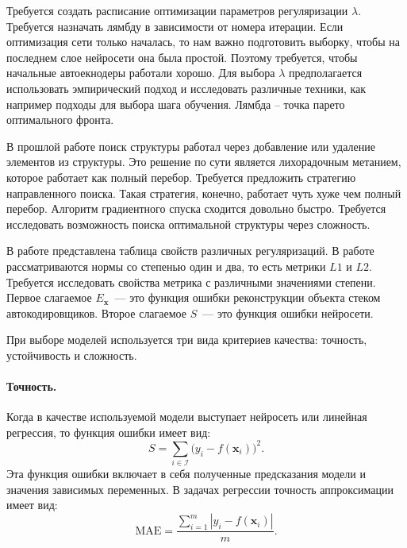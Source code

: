 \documentclass[12pt, twoside]{article}
\newcommand{\xb}{{\mathbf{x}}}
\newenvironment{comment}{}{}
\begin{document}
\begin{comment}
Требуется создать расписание оптимизации параметров регуляризации $\lambda$. Требуется назначать лямбду в зависимости от номера итерации. Если оптимизация сети только началась, то нам важно подготовить выборку, чтобы на последнем слое нейросети она была простой. Поэтому требуется, чтобы начальные автоекнодеры работали хорошо. Для выбора $\lambda$ предполагается использовать эмпирический подход и исследовать различные техники, как например подходы для выбора шага обучения. Лямбда – точка парето оптимального фронта.

В прошлой работе поиск структуры работал через добавление или удаление элементов из структуры. Это решение по сути является лихорадочным метанием, которое работает как полный перебор. Требуется предложить стратегию направленного поиска. Такая стратегия, конечно, работает чуть хуже чем полный перебор. 
Алгоритм градиентного спуска сходится довольно быстро. Требуется исследовать возможность поиска оптимальной структуры через сложность. 




В работе \cite{bib_1} представлена таблица свойств различных регуляризаций. В работе рассматриваются нормы со степенью один и два, то есть метрики $L1$ и $L2$. Требуется исследовать свойства метрика с различными значениями степени. 
Первое слагаемое $E_{\textbf{x}}$~--- это функция ошибки реконструкции объекта стеком автокодировщиков. Второе слагаемое $S$~--- это функция ошибки нейросети.

При выборе моделей используется три вида критериев качества: точность, устойчивость и сложность.

\paragraph{Точность.}

Когда в качестве используемой модели выступает нейросеть или линейная регрессия, 
то функция ошибки имеет вид:
\begin{equation}\label{eq3}
S = \sum_{i\in\mathcal{I}}\big(y_i-f(\xb_i)\big)^2.
\end{equation}
Эта функция ошибки включает в себя полученные предсказания модели и значения зависимых переменных. В задачах регрессии точность аппроксимации имеет вид: 
\begin{equation}\label{eq106}
\text{MAE} =\frac{ \sum\limits_{i=1}^m|y_i-f(\xb_i)|}{m}.
\end{equation}


\end{comment}
\end{document}

